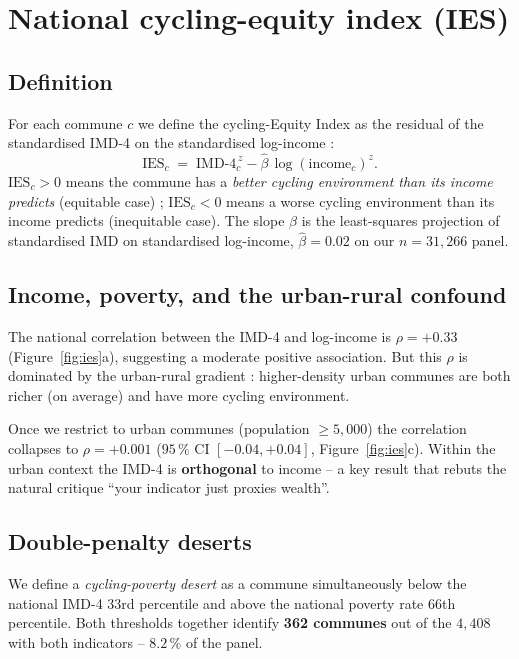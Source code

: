 \documentclass[11pt,a4paper]{article}
\newcommand{\IMD}{\mathrm{IMD}}
\newcommand{\IES}{\mathrm{IES}}
\begin{document}
\section{National cycling-equity index (IES)}
\label{sec:ies}

\subsection{Definition}

For each commune $c$ we define the cycling-Equity Index as
the residual of the standardised IMD-4 on the standardised
log-income :
\[
    \IES_c \;=\; \IMD\text{-}4_c^{\,z}
                  - \widehat{\beta}\, \log(\text{income}_c)^{z}.
\]
$\IES_c > 0$ means the commune has a \emph{better cycling
environment than its income predicts} (equitable case) ;
$\IES_c < 0$ means a worse cycling environment than its income
predicts (inequitable case).  The slope $\widehat{\beta}$ is the
least-squares projection of standardised IMD on standardised
log-income, $\widehat{\beta} = 0.02$ on our $n = 31{,}266$ panel.

\subsection{Income, poverty, and the urban-rural confound}

The national correlation between the IMD-4 and log-income is
$\rho = +0.33$ (Figure~\ref{fig:ies}a), suggesting a moderate
positive association.  But this $\rho$ is dominated by the
urban-rural gradient : higher-density urban communes are both
richer (on average) and have more cycling environment.

Once we restrict to urban communes (population $\geq 5{,}000$)
the correlation collapses to $\rho = +0.001$ ($95\,\%$ CI
$[-0.04, +0.04]$, Figure~\ref{fig:ies}c).  Within the urban
context the IMD-4 is \textbf{orthogonal} to income -- a key
result that rebuts the natural critique ``your indicator just
proxies wealth''.

\subsection{Double-penalty deserts}

We define a \emph{cycling-poverty desert} as a commune
simultaneously below the national IMD-4 33rd percentile and
above the national poverty rate 66th percentile.  Both thresholds
together identify \textbf{362 communes} out of the $4{,}408$ with
both indicators -- $8.2\,\%$ of the panel.
\end{document}
